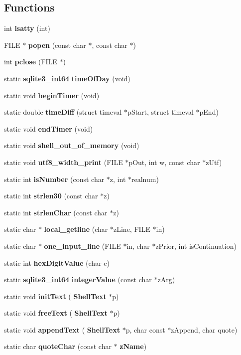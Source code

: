 \subsection*{Functions}
\begin{DoxyCompactItemize}
\item 
int \textbf{ isatty} (int)
\item 
F\+I\+LE $\ast$ \textbf{ popen} (const char $\ast$, const char $\ast$)
\item 
int \textbf{ pclose} (F\+I\+LE $\ast$)
\item 
static \textbf{ sqlite3\+\_\+int64} \textbf{ time\+Of\+Day} (void)
\item 
static void \textbf{ begin\+Timer} (void)
\item 
static double \textbf{ time\+Diff} (struct timeval $\ast$p\+Start, struct timeval $\ast$p\+End)
\item 
static void \textbf{ end\+Timer} (void)
\item 
static void \textbf{ shell\+\_\+out\+\_\+of\+\_\+memory} (void)
\item 
static void \textbf{ utf8\+\_\+width\+\_\+print} (F\+I\+LE $\ast$p\+Out, int w, const char $\ast$z\+Utf)
\item 
static int \textbf{ is\+Number} (const char $\ast$z, int $\ast$realnum)
\item 
static int \textbf{ strlen30} (const char $\ast$z)
\item 
static int \textbf{ strlen\+Char} (const char $\ast$z)
\item 
static char $\ast$ \textbf{ local\+\_\+getline} (char $\ast$z\+Line, F\+I\+LE $\ast$in)
\item 
static char $\ast$ \textbf{ one\+\_\+input\+\_\+line} (F\+I\+LE $\ast$in, char $\ast$z\+Prior, int is\+Continuation)
\item 
static int \textbf{ hex\+Digit\+Value} (char c)
\item 
static \textbf{ sqlite3\+\_\+int64} \textbf{ integer\+Value} (const char $\ast$z\+Arg)
\item 
static void \textbf{ init\+Text} (\textbf{ Shell\+Text} $\ast$p)
\item 
static void \textbf{ free\+Text} (\textbf{ Shell\+Text} $\ast$p)
\item 
static void \textbf{ append\+Text} (\textbf{ Shell\+Text} $\ast$p, char const $\ast$z\+Append, char quote)
\item 
static char \textbf{ quote\+Char} (const char $\ast$\textbf{ z\+Name})
\item 

\end{DoxyCompactItemize}

